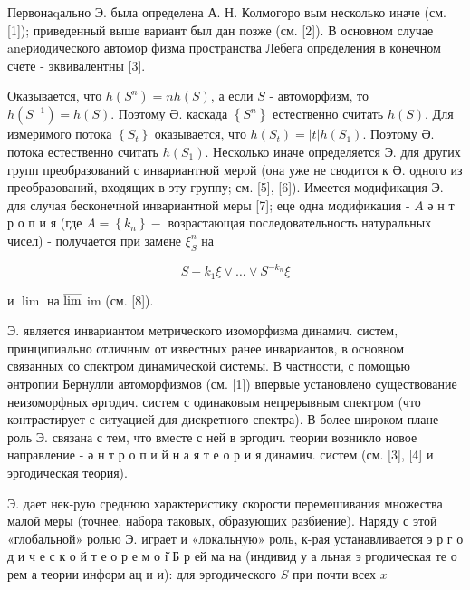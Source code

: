 \documentclass[10pt]{article}
\begin{document}
Первонаqально Э. была определена А. Н. Колмогоро вым несколько иначе (см. [1]); приведенный выше вариант был дан позже (см. [2]). В основном случае aneриодического автомор физма пространства Лебега определения в конечном счете - эквивалентны [3].



Оказывается, что $h\left(S^{n}\right)=n h(S)$, а если $S$ - автоморфизм, то $h\left(S^{-1}\right)=h(S)$. Поэтому Ә. каскада $\left\{S^{n}\right\}$ естественно считать $h(S)$. Для измеримого потока $\left\{S_{t}\right\}$ оказывается, что $h\left(S_{t}\right)=|t| h\left(S_{1}\right)$. Поэтому $Ә$. потока естественно считать $h\left(S_{1}\right)$. Несколько иначе определяется Э. для других групп преобразований с инвариантной мерой (она уже не сводится к Ә. одного из преобразований, входящих в эту группу; см. [5], [6]). Имеется модификация Э. для случая бесконечной инвариантной меры [7]; еце одна модификация - $A$ ә н т р о п и я (где $A=\left\{k_{n}\right\}-$ возрастающая последовательность натуральных чисел) - получается при замене $\xi_{S}^{n}$ на



\[

S-k_{1} \xi \vee \ldots \vee S^{-k_{n}} \xi

\]



и $\lim$ на $\varlimsup$ im (см. [8]).



Э. является инвариантом метрического изоморфизма динамич. систем, принципиально отличным от известных ранее инвариантов, в основном связанных со спектром динамической системы. В частности, с помощью әнтропии Бернулли автоморфизмов (см. [1]) впервые установлено существование неизоморфных әргодич. систем с одинаковым непрерывным спектром (что контрастирует с ситуацией для дискретного спектра). В более широком плане роль Э. связана с тем, что вместе с ней в эргодич. теории возникло новое направление - ә н т р о п и й н а я т е о р и я динамич. систем (см. [3], [4] и эргодическая теория).



Э. дает нек-рую среднюю характеристику скорости перемешивания множества малой меры (точнее, набора таковых, образующих разбиение). Наряду с этой «глобальной» ролью Э. играет и «локальную» роль, к-рая устанавливается э р г о д и ч е с к о й т е о р е м о і̆ Б р ей ма на (индивид у а льная э ргодическая те о рем а теории информ ац и и): для эргодического $S$ при почти всех $x$
\end{document}
